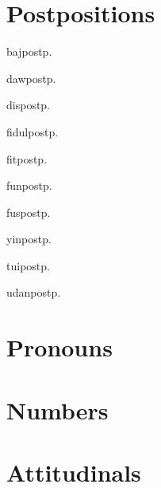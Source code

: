 \begin{multicols*}{2}
\section{Postpositions}

\begin{description}[leftmargin=*]
    \begin{dictentry}{baj}{postp.}
    \end{dictentry}
    \begin{dictentry}{daw}{postp.}
    \end{dictentry}
    \begin{dictentry}{dis}{postp.}
    \end{dictentry}
    \begin{dictentry}{fidul}{postp.}
    \end{dictentry}
    \begin{dictentry}{fit}{postp.}
    \end{dictentry}
    \begin{dictentry}{fun}{postp.}
    \end{dictentry}
    \begin{dictentry}{fus}{postp.}
    \end{dictentry}
    \begin{dictentry}{yin}{postp.}
    \end{dictentry}
    \begin{dictentry}{tui}{postp.}
    \end{dictentry}
    \begin{dictentry}{udan}{postp.}
    \end{dictentry}
\end{description}

\section{Pronouns}

\section{Numbers}

\section{Attitudinals}


\end{multicols*}
